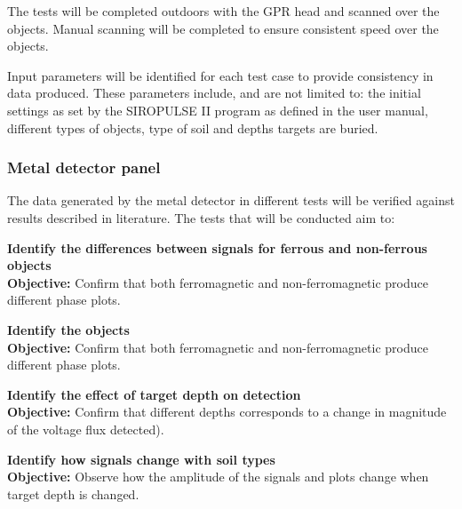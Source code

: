\documentclass[main.tex]{subfiles}
\begin{document}
\begin{appendices}

\medskip\noindent
The tests will be completed outdoors with the GPR head and scanned over the objects. Manual scanning will be completed to ensure consistent speed over the objects. 

\medskip\noindent
Input parameters will be identified for each test case to provide consistency in data produced. These parameters include, and are not limited to: the initial settings as set by the SIROPULSE II program as defined in the user manual, different types of objects, type of soil and depths targets are buried.

\subsubsection{Metal detector panel}
The data generated by the metal detector in different tests will be verified against results described in literature. The tests that will be conducted aim to:
\begin{mds}
\textbf{Identify the differences between signals for ferrous and non-ferrous objects}\\
\textbf{Objective:} Confirm that both ferromagnetic and non-ferromagnetic produce different phase plots.

\end{mds}

\begin{mds}
\textbf{Identify the objects}\\
\textbf{Objective:} Confirm that both ferromagnetic and non-ferromagnetic produce different phase plots.

\end{mds}

\begin{mds}
\textbf{Identify the effect of target depth on detection}\\
\textbf{Objective:} Confirm that different depths corresponds to a change in magnitude of the voltage flux detected). 

\end{mds}
\begin{mds}
\textbf{Identify how signals change with soil types}\\
\textbf{Objective:} Observe how the amplitude of the signals and plots change when target depth is changed. 


\end{mds}
\end{appendices}
\end{document}
